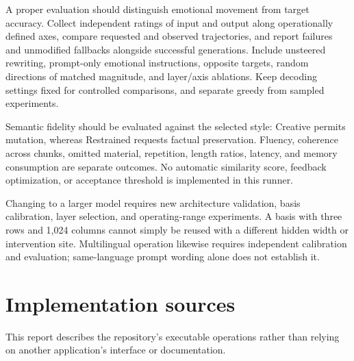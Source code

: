 \documentclass[manuscript,screen,nonacm]{acmart}
\begin{document}
A proper evaluation should distinguish emotional movement from target
accuracy. Collect independent ratings of input and output along
operationally defined axes, compare requested and observed trajectories,
and report failures and unmodified fallbacks alongside successful
generations. Include unsteered rewriting, prompt-only emotional
instructions, opposite targets, random directions of matched magnitude,
and layer/axis ablations. Keep decoding settings fixed for controlled
comparisons, and separate greedy from sampled experiments.

Semantic fidelity should be evaluated against the selected style:
Creative permits mutation, whereas Restrained requests factual
preservation. Fluency, coherence across chunks, omitted material,
repetition, length ratios, latency, and memory consumption are separate
outcomes. No automatic similarity score, feedback optimization, or
acceptance threshold is implemented in this runner.

Changing to a larger model requires new architecture validation, basis
calibration, layer selection, and operating-range experiments. A basis
with three rows and 1,024 columns cannot simply be reused with a
different hidden width or intervention site. Multilingual operation
likewise requires independent calibration and evaluation; same-language
prompt wording alone does not establish it.

\section{Implementation sources}\label{implementation-sources}

This report describes the repository's executable operations rather than
relying on another application's interface or documentation.
\end{document}
